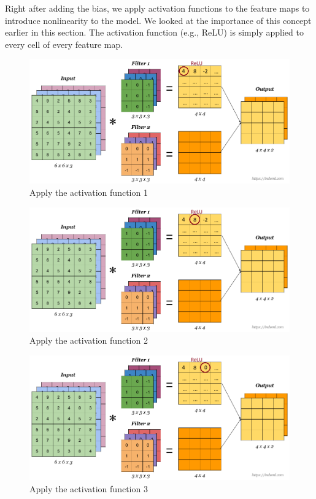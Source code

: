 \documentclass[a4paper,12pt]{report}
\begin{document}
\FloatBarrier
Right after adding the bias, we apply activation functions to the feature maps to introduce nonlinearity to the model. We looked at the importance of this concept earlier in this section. The activation function (e.g., ReLU) is simply applied to every cell of every feature map. 
\begin{figure}[htbp]
  \centering
  \includegraphics[width=\textwidth]{images/CNN_filters_4.png}
  \caption{Apply the activation function 1}
  \label{fig:fullwidth}
\end{figure}

\begin{figure}[htbp]
  \centering
  \includegraphics[width=\textwidth]{images/CNN_filters_5.png}
  \caption{Apply the activation function 2}
  \label{fig:fullwidth}
\end{figure}

\FloatBarrier
\begin{figure}[htbp]
  \centering
  \includegraphics[width=\textwidth]{images/CNN_filters_6.png}
  \caption{Apply the activation function 3}
  \label{fig:fullwidth}
\end{figure}
	
\end{document}
